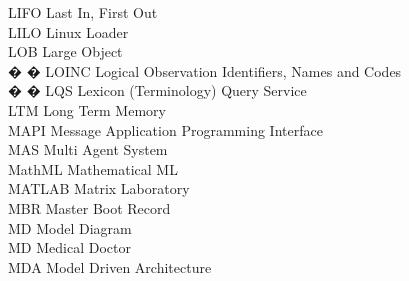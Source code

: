 \begin{tabbing}
    \>LIFO \>\>Last In, First Out\\

    \>LILO \>\>Linux Loader\\


    \>LOB \>\>Large Object\\

� � \>LOINC \>\>Logical Observation Identifiers, Names and Codes\\

� � \>LQS \>\>Lexicon (Terminology) Query Service\\




    \>LTM \>\>Long Term Memory\\





    \>MAPI \>\>Message Application Programming Interface\\

    \>MAS \>\>Multi Agent System\\

    \>MathML \>\>Mathematical ML\\

    \>MATLAB \>\>Matrix Laboratory\\

    \>MBR \>\>Master Boot Record\\

    \>MD \>\>Model Diagram\\

    \>MD \>\>Medical Doctor\\

    \>MDA \>\>Model Driven Architecture\\


\end{tabbing}
